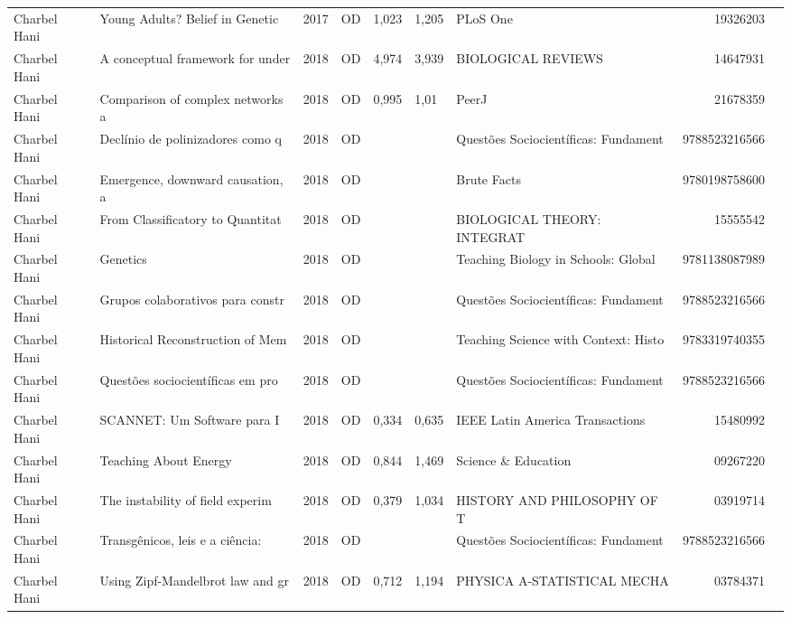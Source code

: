 \documentclass[12pt,brazil]{article}\usepackage[]{graphicx}\usepackage[]{xcolor}
\begin{document}
\begin{longtable}{lllrrllrr}
Charbel Hani & Young Adults? Belief in Genetic  & 2017 & OD & 1,023 & 1,205 & PLoS One & 19326203 \\
Charbel Hani & A conceptual framework for under & 2018 & OD & 4,974 & 3,939 & BIOLOGICAL REVIEWS & 14647931 \\
Charbel Hani & Comparison of complex networks a & 2018 & OD & 0,995 & 1,01 & PeerJ & 21678359 \\
\rowcolor{coautr}\rowcolor{coautr}\rowcolor{coautr}\rowcolor{coautr}\rowcolor{coautr}\rowcolor{coautr}\rowcolor{coautr}\rowcolor{coautr}\rowcolor{coautr}\rowcolor{coautr}\rowcolor{coautr}\rowcolor{coautr}\rowcolor{coautr}\rowcolor{coautr}\rowcolor{coautr}\rowcolor{coautr}Charbel Hani & Declínio de polinizadores como q & 2018 & OD &  &  & Questões Sociocientíficas: Fundament & 9788523216566 \\
Charbel Hani & Emergence, downward causation, a & 2018 & OD &  &  & Brute Facts & 9780198758600 \\
Charbel Hani & From Classificatory to Quantitat & 2018 & OD &  &  & BIOLOGICAL THEORY: INTEGRAT & 15555542 \\
Charbel Hani & Genetics & 2018 & OD &  &  & Teaching Biology in Schools: Global  & 9781138087989 \\
Charbel Hani & Grupos colaborativos para constr & 2018 & OD &  &  & Questões Sociocientíficas: Fundament & 9788523216566 \\
Charbel Hani & Historical Reconstruction of Mem & 2018 & OD &  &  & Teaching Science with Context: Histo & 9783319740355 \\
Charbel Hani & Questões sociocientíficas em pro & 2018 & OD &  &  & Questões Sociocientíficas: Fundament & 9788523216566 \\
Charbel Hani & SCANNET: Um Software para I & 2018 & OD & 0,334 & 0,635 & IEEE Latin America Transactions & 15480992 \\
Charbel Hani & Teaching About Energy & 2018 & OD & 0,844 & 1,469 & Science \& Education & 09267220 \\
Charbel Hani & The instability of field experim & 2018 & OD & 0,379 & 1,034 & HISTORY AND PHILOSOPHY OF T & 03919714 \\
Charbel Hani & Transgênicos, leis e a ciência:  & 2018 & OD &  &  & Questões Sociocientíficas: Fundament & 9788523216566 \\
\rowcolor{coautr}\rowcolor{coautr}\rowcolor{coautr}\rowcolor{coautr}\rowcolor{coautr}\rowcolor{coautr}\rowcolor{coautr}\rowcolor{coautr}\rowcolor{coautr}\rowcolor{coautr}\rowcolor{coautr}\rowcolor{coautr}\rowcolor{coautr}\rowcolor{coautr}\rowcolor{coautr}\rowcolor{coautr}Charbel Hani & Using Zipf-Mandelbrot law and gr & 2018 & OD & 0,712 & 1,194 & PHYSICA A-STATISTICAL MECHA & 03784371 \\

\end{longtable}
\end{document}
